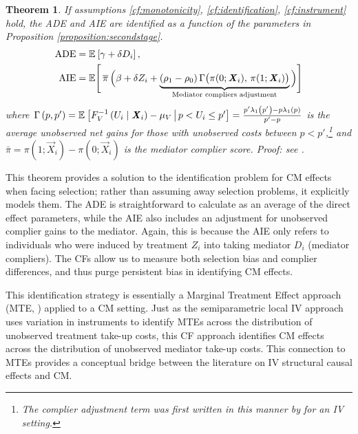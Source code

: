 \newtheorem{theoremCF}{Theorem}
\renewcommand\thetheoremCF{CF}
\begin{theoremCF}
    \label{thm:cf-identification}
    If assumptions \ref{cf:monotonicity}, \ref{cf:identification}, \ref{cf:instrument} hold, the ADE and AIE are identified as a function of the parameters in Proposition \ref{proposition:secondstage}.
    \begin{align*}
    \text{ADE}
        &= \mathbb{E}_{} \left[ \gamma + \delta D_i \right], \\
    \text{AIE}
        &= \mathbb E \Bigg[ \, \overline{\pi} \,
            \Big( \beta +  \delta Z_i +
                \underbrace{ (\rho_1 - \rho_0) \,
                \Gamma \big(\pi(0; \boldsymbol{\mathit{X}}_i), \, \pi(1; \boldsymbol{\mathit{X}}_i) \big)}_{
                    \text{Mediator compliers adjustment}} \Big) \Bigg]
    \end{align*}
    where $\Gamma\left(p,p'\right) 
    = \mathbb{E}_{} \left[  F_V^{-1}\left( U_i \mid \boldsymbol{\mathit{X}}_i \right) - \mu_V \, \middle\vert \, p < U_i \leq p' \right]
    = \frac{p'\lambda_1\left(p'\right) - p\lambda_1\left(p\right)}{p' - p}$ is the average unobserved net gains for those with unobserved costs between $p < p'$,\footnote{
        The complier adjustment term was first written in this manner by \cite{kline2019heckits} for an IV setting.
    } and $\bar\pi = \pi(1; \vec X_i) - \pi(0; \vec X_i)$ is the mediator complier score.
    Proof: see .
\end{theoremCF}

This theorem provides a solution to the identification problem for CM effects when facing selection;
rather than assuming away selection problems, it explicitly models them.
The ADE is straightforward to calculate as an average of the direct effect parameters, while the AIE also includes an adjustment for unobserved complier gains to the mediator.
Again, this is because the AIE only refers to individuals who were induced by treatment $Z_i$ into taking mediator $D_i$ (mediator compliers).
The CFs allow us to measure both selection bias and complier differences, and thus purge persistent bias in identifying CM effects.

This identification strategy is essentially a Marginal Treatment Effect approach (MTE, \citealt{heckman2005structural}) applied to a CM setting.
Just as the semiparametric local IV approach uses variation in instruments to identify MTEs across the distribution of unobserved treatment take-up costs, this CF approach identifies CM effects across the distribution of unobserved mediator take-up costs.
This connection to MTEs provides a conceptual bridge between the literature on IV structural causal effects and CM.

